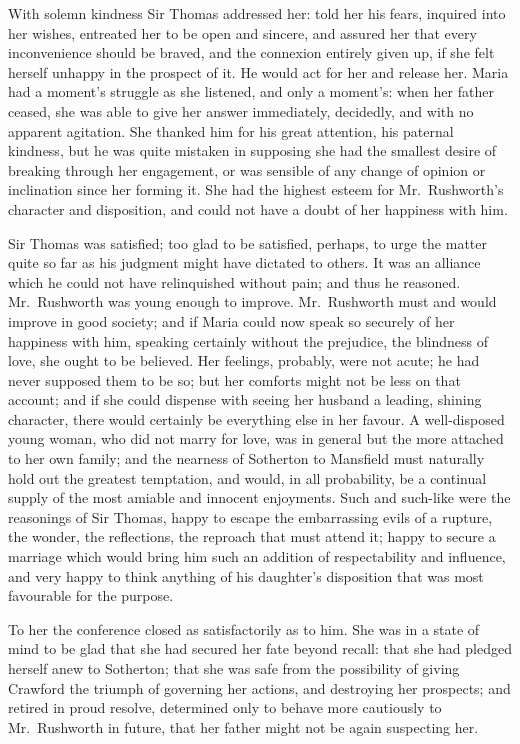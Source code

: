 \documentclass{article}
\begin{document}
With solemn kindness Sir Thomas addressed her:  told her
his fears, inquired into her wishes, entreated her to be
open and sincere, and assured her that every inconvenience
should be braved, and the connexion entirely given up,
if she felt herself unhappy in the prospect of it.
He would act for her and release her.  Maria had a moment's
struggle as she listened, and only a moment's: when her
father ceased, she was able to give her answer immediately,
decidedly, and with no apparent agitation.  She thanked
him for his great attention, his paternal kindness, but he
was quite mistaken in supposing she had the smallest desire
of breaking through her engagement, or was sensible of any
change of opinion or inclination since her forming it.
She had the highest esteem for Mr.\ Rushworth's character
and disposition, and could not have a doubt of her happiness with
him.

Sir Thomas was satisfied; too glad to be satisfied,
perhaps, to urge the matter quite so far as his judgment
might have dictated to others.  It was an alliance which
he could not have relinquished without pain; and thus
he reasoned.  Mr.\ Rushworth was young enough to improve.
Mr.\ Rushworth must and would improve in good society;
and if Maria could now speak so securely of her happiness
with him, speaking certainly without the prejudice,
the blindness of love, she ought to be believed.
Her feelings, probably, were not acute; he had never
supposed them to be so; but her comforts might not
be less on that account; and if she could dispense
with seeing her husband a leading, shining character,
there would certainly be everything else in her favour.
A well-disposed young woman, who did not marry for love,
was in general but the more attached to her own family;
and the nearness of Sotherton to Mansfield must naturally hold
out the greatest temptation, and would, in all probability,
be a continual supply of the most amiable and innocent enjoyments.
Such and such-like were the reasonings of Sir Thomas,
happy to escape the embarrassing evils of a rupture,
the wonder, the reflections, the reproach that must
attend it; happy to secure a marriage which would bring
him such an addition of respectability and influence,
and very happy to think anything of his daughter's
disposition that was most favourable for the purpose.

To her the conference closed as satisfactorily as to him.
She was in a state of mind to be glad that she had secured
her fate beyond recall:  that she had pledged herself
anew to Sotherton; that she was safe from the possibility
of giving Crawford the triumph of governing her actions,
and destroying her prospects; and retired in proud resolve,
determined only to behave more cautiously to Mr.\ Rushworth
in future, that her father might not be again suspecting her.
\end{document}
